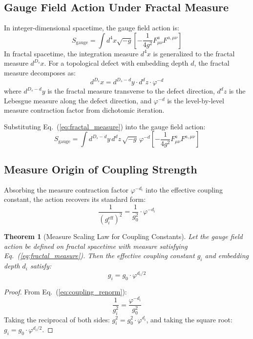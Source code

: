 \documentclass[12pt,a4paper,twocolumn]{article}
\renewcommand{\phi}{\varphi}
\newtheorem{theorem}{Theorem}[section]
\begin{document}
\subsection{Gauge Field Action Under Fractal Measure}
\label{subsec:fractal_gauge_action}
In integer-dimensional spacetime, the gauge field action is:
\[
S_{\text{gauge}} = \int d^4x \sqrt{-g} \left[ -\frac{1}{4g^2} F_{\mu\nu}^a F^{a,\mu\nu} \right]
\]
In fractal spacetime, the integration measure $d^4x$ is generalized to the fractal measure $d^{D_s}x$. For a topological defect with embedding depth $d$, the fractal measure decomposes as:
\begin{equation}
d^{D_s}x = d^{D_s-d}y \cdot d^d z \cdot \phi^{-d}
\label{eq:fractal_measure}
\end{equation}
where $d^{D_s-d}y$ is the fractal measure transverse to the defect direction, $d^d z$ is the Lebesgue measure along the defect direction, and $\phi^{-d}$ is the level-by-level measure contraction factor from dichotomic iteration.

Substituting Eq.~(\ref{eq:fractal_measure}) into the gauge field action:
\[
S_{\text{gauge}} = \int d^{D_s-d}y \, d^d z \, \sqrt{-g} \, \phi^{-d} \left[ -\frac{1}{4g^2} F_{\mu\nu}^a F^{a,\mu\nu} \right]
\]

\subsection{Measure Origin of Coupling Strength}
Absorbing the measure contraction factor $\phi^{-d_i}$ into the effective coupling constant, the action recovers its standard form:
\begin{equation}
\frac{1}{(g_i^{\text{eff}})^2} = \frac{1}{g_0^2} \cdot \phi^{-d_i}
\label{eq:coupling_renorm}
\end{equation}

\begin{theorem}[Measure Scaling Law for Coupling Constants]
\label{thm:coupling_scaling}
Let the gauge field action be defined on fractal spacetime with measure satisfying Eq.~(\ref{eq:fractal_measure}). Then the effective coupling constant $g_i$ and embedding depth $d_i$ satisfy:
\begin{equation}
g_i = g_0 \cdot \phi^{d_i/2}
\label{eq:g_i_scaling}
\end{equation}
\end{theorem}

\begin{proof}
From Eq.~(\ref{eq:coupling_renorm}):
\[
\frac{1}{g_i^2} = \frac{\phi^{-d_i}}{g_0^2}
\]
Taking the reciprocal of both sides: $g_i^2 = g_0^2 \cdot \phi^{d_i}$, and taking the square root: $g_i = g_0 \cdot \phi^{d_i/2}$.
\end{proof}
\end{document}

